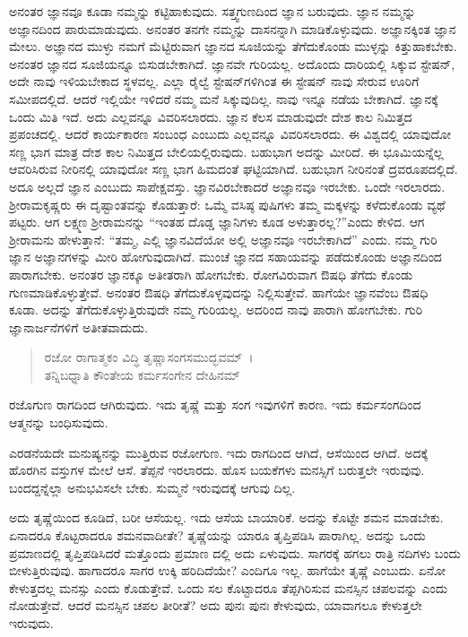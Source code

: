 ಅನಂತರ ಜ್ಞಾನವೂ ಕೂಡಾ ನಮ್ಮನ್ನು ಕಟ್ಟಿಹಾಕುವುದು. ಸತ್ತ್ವಗುಣದಿಂದ ಜ್ಞಾನ ಬರುವುದು. ಜ್ಞಾನ ನಮ್ಮನ್ನು ಅಜ್ಞಾನದಿಂದ ಪಾರುಮಾಡುವುದು. ಅನಂತರ ತನಗೇ ನಮ್ಮನ್ನು ದಾಸನನ್ನಾಗಿ ಮಾಡಿಕೊಳ್ಳುವುದು. ಅಜ್ಞಾನಕ್ಕಿಂತ ಜ್ಞಾನ ಮೇಲು. ಅಜ್ಞಾನದ ಮುಳ್ಳು ನಮಗೆ ಮೆಟ್ಟಿರುವಾಗ ಜ್ಞಾನದ ಸೂಜಿಯನ್ನು ತೆಗೆದುಕೊಂಡು ಮುಳ್ಳನ್ನು ಕಿತ್ತುಹಾಕಬೇಕು. ಅನಂತರ ಜ್ಞಾನದ ಸೂಜಿಯನ್ನೂ ಬಿಸುಡಬೇಕಾಗಿದೆ. ಜ್ಞಾನವೇ ಗುರಿಯಲ್ಲ. ಅದೊಂದು ದಾರಿಯಲ್ಲಿ ಸಿಕ್ಕುವ ಸ್ಟೇಷನ್, ಅದೇ ನಾವು ಇಳಿಯಬೇಕಾದ ಸ್ಥಳವಲ್ಲ. ಎಲ್ಲಾ ರೈಲ್ವೆ ಸ್ಟೇಷನ್​ಗಳಿಗಿಂತ ಈ ಸ್ಟೇಷನ್ ನಾವು ಸೇರುವ ಊರಿಗೆ ಸಮೀಪದಲ್ಲಿದೆ. ಆದರೆ ಇಲ್ಲಿಯೇ ಇಳಿದರೆ ನಮ್ಮ ಮನೆ ಸಿಕ್ಕುವುದಿಲ್ಲ. ನಾವು ಇನ್ನೂ ನಡೆಯ ಬೇಕಾಗಿದೆ. ಜ್ಞಾನಕ್ಕೆ ಒಂದು ಮಿತಿ ಇದೆ. ಅದು ಎಲ್ಲವನ್ನೂ ವಿವರಿಸಲಾರದು. ಜ್ಞಾನ ಕೆಲಸ ಮಾಡುವುದೇ ದೇಶ ಕಾಲ ನಿಮಿತ್ತದ ಪ್ರಪಂಚದಲ್ಲಿ. ಆದರೆ ಕಾರ್ಯಕಾರಣ ಸಂಬಂಧ ಎಂಬುದು ಎಲ್ಲವನ್ನೂ ವಿವರಿಸಲಾರದು. ಈ ವಿಶ್ವದಲ್ಲಿ ಯಾವುದೋ ಸಣ್ಣ ಭಾಗ ಮಾತ್ರ ದೇಶ ಕಾಲ ನಿಮಿತ್ತದ ಬೇಲಿಯಲ್ಲಿರುವುದು. ಬಹುಭಾಗ ಅದನ್ನು ಮೀರಿದೆ. ಈ ಭೂಮಿಯನ್ನೆಲ್ಲ ಆವರಿಸಿರುವ ನೀರಿನಲ್ಲಿ ಯಾವುದೋ ಸಣ್ಣ ಭಾಗ ಹಿಮದಂತೆ ಘಟ್ಟಿಯಾಗಿದೆ. ಬಹುಭಾಗ ನೀರಿನಂತೆ ದ್ರವರೂಪದಲ್ಲಿದೆ. ಅದೂ ಅಲ್ಲದೆ ಜ್ಞಾನ ಎಂಬುದು ಸಾಪೇಕ್ಷವಸ್ತು. ಜ್ಞಾನವಿರಬೇಕಾದರೆ ಅಜ್ಞಾನವೂ ಇರಬೇಕು. ಒಂದೇ ಇರಲಾರದು. ಶ‍್ರೀರಾಮಕೃಷ್ಣರು ಈ ದೃಷ್ಟಾಂತವನ್ನು ಕೊಡುತ್ತಾರೆ: ಒಮ್ಮೆ ವಸಿಷ್ಠ ಪುಷಿಗಳು ತಮ್ಮ ಮಕ್ಕಳನ್ನು ಕಳೆದುಕೊಂಡು ವ್ಯಥೆ ಪಟ್ಟರು. ಆಗ ಲಕ್ಷ್ಮಣ ಶ‍್ರೀರಾಮನನ್ನು “ಇಂತಹ ದೊಡ್ಡ ಜ್ಞಾನಿಗಳು ಕೂಡ ಅಳುತ್ತಾರಲ್ಲ?”ಎಂದು ಕೇಳಿದ. ಆಗ ಶ‍್ರೀರಾಮನು ಹೇಳುತ್ತಾನೆ: “ತಮ್ಮ, ಎಲ್ಲಿ ಜ್ಞಾನವಿದೆಯೋ ಅಲ್ಲಿ ಅಜ್ಞಾನವೂ ಇರಬೇಕಾಗಿದೆ” ಎಂದು. ನಮ್ಮ ಗುರಿ ಜ್ಞಾನ ಅಜ್ಞಾನಗಳನ್ನು ಮೀರಿ ಹೋಗುವುದಾಗಿದೆ. ಮುಂಚೆ ಜ್ಞಾನದ ಸಹಾಯವನ್ನು ಪಡೆದುಕೊಂಡು ಅಜ್ಞಾನದಿಂದ ಪಾರಾಗಬೇಕು. ಅನಂತರ ಜ್ಞಾನಕ್ಕೂ ಅತೀತರಾಗಿ ಹೋಗಬೇಕು. ರೋಗವಿರುವಾಗ ಔಷಧಿ ತೆಗೆದು ಕೊಂಡು ಗುಣಮಾಡಿಕೊಳ್ಳುತ್ತೇವೆ. ಅನಂತರ ಔಷಧಿ ತೆಗೆದುಕೊಳ್ಳವುದನ್ನು ನಿಲ್ಲಿಸುತ್ತೇವೆ. ಹಾಗೆಯೇ ಜ್ಞಾನವೆಂಬ ಔಷಧಿ ಕೂಡಾ. ಅದನ್ನು ತೆಗೆದುಕೊಳ್ಳುತ್ತಿರುವುದೇ ನಮ್ಮ ಗುರಿಯಲ್ಲ. ಅದರಿಂದ ನಾವು ಪಾರಾಗಿ ಹೋಗಬೇಕು. ಗುರಿ ಜ್ಞಾನಾರ್ಜನೆಗಳಿಗೆ ಅತೀತವಾದುದು.

\begin{verse}
ರಜೋ ರಾಗಾತ್ಮಕಂ ವಿದ್ಧಿ ತೃಷ್ಣಾಸಂಗಸಮುದ್ಭವಮ್~।\\ತನ್ನಿಬಧ್ನಾತಿ ಕೌಂತೇಯ ಕರ್ಮಸಂಗೇನ ದೇಹಿನಮ್ 
\end{verse}

{\small ರಜೊಗುಣ ರಾಗದಿಂದ ಆಗಿರುವುದು. ಇದು ತೃಷ್ಣೆ ಮತ್ತು ಸಂಗ ಇವುಗಳಿಗೆ ಕಾರಣ. ಇದು ಕರ್ಮಸಂಗದಿಂದ ಆತ್ಮನನ್ನು ಬಂಧಿಸುವುದು.}

ಎರಡನೆಯದೇ ಮನುಷ್ಯನನ್ನು ಮುತ್ತಿರುವ ರಜೋಗುಣ. ಇದು ರಾಗದಿಂದ ಆಗಿದೆ, ಆಸೆಯಿಂದ ಆಗಿದೆ. ಅದಕ್ಕೆ ಹೊರಗಿನ ವಸ್ತುಗಳ ಮೇಲೆ ಆಸೆ. ತೆಪ್ಪನೆ ಇರಲಾರದು. ಹೊಸ ಬಯಕೆಗಳು ಮನಸ್ಸಿಗೆ ಬರುತ್ತಲೇ ಇರುವುವು. ಬಂದದ್ದನ್ನೆಲ್ಲಾ ಅನುಭವಿಸಲೇ ಬೇಕು. ಸುಮ್ಮನೆ ಇರುವುದಕ್ಕೆ ಆಗುವು ದಿಲ್ಲ.

ಅದು ತೃಷ್ಣೆಯಿಂದ ಕೂಡಿದೆ, ಬರೀ ಆಸೆಯಲ್ಲ. ಇದು ಆಸೆಯ ಬಾಯಾರಿಕೆ. ಅದನ್ನು ಕೊಟ್ಟೇ ಶಮನ ಮಾಡಬೇಕು. ಏನಾದರೂ ಕೊಟ್ಟರಾದರೂ ಶಮನವಾದೀತೇ? ತೃಷ್ಣೆಯನ್ನು ಯಾರೂ ತೃಪ್ತಿಪಡಿಸಿ ಪಾರಾಗಿಲ್ಲ. ಅದನ್ನು ಒಂದು ಪ್ರಮಾಣದಲ್ಲಿ ತೃಪ್ತಿಪಡಿಸಿದರೆ ಮತ್ತೊಂದು ಪ್ರಮಾಣ ದಲ್ಲಿ ಅದು ಏಳುವುದು. ಸಾಗರಕ್ಕೆ ಹಗಲು ರಾತ್ರಿ ನದಿಗಳು ಬಂದು ಬೀಳುತ್ತಿರುವುವು. ಹಾಗಾದರೂ ಸಾಗರ ಉಕ್ಕಿ ಹರಿದಿದೆಯೇ? ಎಂದಿಗೂ ಇಲ್ಲ. ಹಾಗೆಯೇ ತೃಷ್ಣೆ ಎಂಬುದು. ಏನೋ ಕೇಳುತ್ತದಲ್ಲ ಮನಸ್ಸು ಎಂದು ಕೊಡುತ್ತೇವೆ. ಒಂದು ಸಲ ಕೊಟ್ಟಾದರೂ ತೆಪ್ಪಗಿರಿಸುವ ಮನಸ್ಸಿನ ಚಪಲವನ್ನು ಎಂದು ನೋಡುತ್ತೇವೆ. ಆದರೆ ಮನಸ್ಸಿನ ಚಪಲ ತೀರೀತೆ? ಅದು ಪುನಃ ಪುನಃ ಕೇಳುವುದು, ಯಾವಾಗಲೂ ಕೇಳುತ್ತಲೇ ಇರುವುದು.


